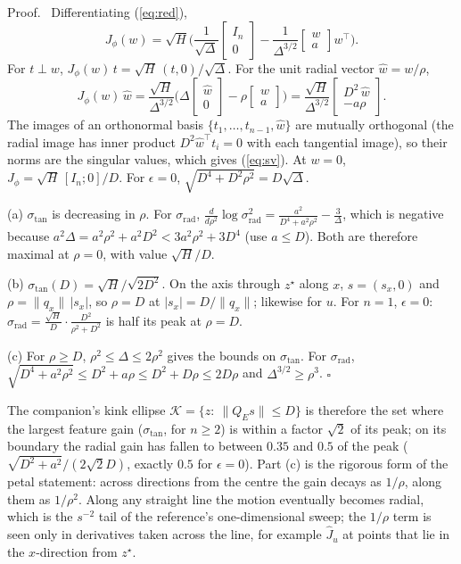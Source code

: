 \documentclass[11pt]{article}
\theoremstyle{plainnote}
\renewenvironment{proof}[1][Proof]{\par\noindent #1.\ }{\hfill$\square$\par}
\newcommand{\Ju}{\hat J_u}
\begin{document}
\begin{proof}
Differentiating (\ref{eq:red}),
\[
J_\phi(w)=\sqrt H\Big(\frac{1}{\sqrt \Delta}\begin{bmatrix}I_n\\0\end{bmatrix}-\frac{1}{\Delta^{3/2}}\begin{bmatrix}w\\a\end{bmatrix}w^\top\Big).
\]
For $t\perp w$, $J_\phi(w)\,t=\sqrt H\,(t,0)/\sqrt \Delta$. For the unit radial vector $\hat w=w/\rho$,
\[
J_\phi(w)\,\hat w=\frac{\sqrt H}{\Delta^{3/2}}\Big(\Delta\begin{bmatrix}\hat w\\0\end{bmatrix}-\rho\begin{bmatrix}w\\a\end{bmatrix}\Big)=\frac{\sqrt H}{\Delta^{3/2}}\begin{bmatrix}D^2\,\hat w\\-a\rho\end{bmatrix}.
\]
The images of an orthonormal basis $\{t_1,\dots,t_{n-1},\hat w\}$ are mutually orthogonal (the radial image has inner product $D^2\hat w^\top t_i=0$ with each tangential image), so their norms are the singular values, which gives (\ref{eq:sv}). At $w=0$, $J_\phi=\sqrt H\,[I_n;0]/D$. For $\epsilon=0$, $\sqrt{D^4+D^2\rho^2}=D\sqrt \Delta$.

(a) $\sigma_{\mathrm{tan}}$ is decreasing in $\rho$. For $\sigma_{\mathrm{rad}}$, $\frac{d}{d\rho^2}\log\sigma_{\mathrm{rad}}^2=\frac{a^2}{D^4+a^2\rho^2}-\frac{3}{\Delta}$, which is negative because $a^2\Delta=a^2\rho^2+a^2D^2<3a^2\rho^2+3D^4$ (use $a\le D$). Both are therefore maximal at $\rho=0$, with value $\sqrt H/D$.

(b) $\sigma_{\mathrm{tan}}(D)=\sqrt H/\sqrt{2D^2}$. On the axis through $z^\star$ along $x$, $s=(s_x,0)$ and $\rho=\|q_x\|\,|s_x|$, so $\rho=D$ at $|s_x|=D/\|q_x\|$; likewise for $u$. For $n=1$, $\epsilon=0$: $\sigma_{\mathrm{rad}}=\frac{\sqrt H}{D}\cdot\frac{D^2}{\rho^2+D^2}$ is half its peak at $\rho=D$.

(c) For $\rho\ge D$, $\rho^2\le \Delta\le2\rho^2$ gives the bounds on $\sigma_{\mathrm{tan}}$. For $\sigma_{\mathrm{rad}}$, $\sqrt{D^4+a^2\rho^2}\le D^2+a\rho\le D^2+D\rho\le2D\rho$ and $\Delta^{3/2}\ge\rho^3$.
\end{proof}

The companion's kink ellipse $\mathcal K=\{z:\ \|Q_Es\|\le D\}$ is therefore the set where the largest feature gain ($\sigma_{\mathrm{tan}}$, for $n\ge2$) is within a factor $\sqrt2$ of its peak; on its boundary the radial gain has fallen to between $0.35$ and $0.5$ of the peak ($\sqrt{D^2+a^2}/(2\sqrt2D)$, exactly $0.5$ for $\epsilon=0$). Part (c) is the rigorous form of the petal statement: across directions from the centre the gain decays as $1/\rho$, along them as $1/\rho^2$. Along any straight line the motion eventually becomes radial, which is the $s^{-2}$ tail of the reference's one-dimensional sweep; the $1/\rho$ term is seen only in derivatives taken across the line, for example $\Ju$ at points that lie in the $x$-direction from $z^\star$.
\end{document}
